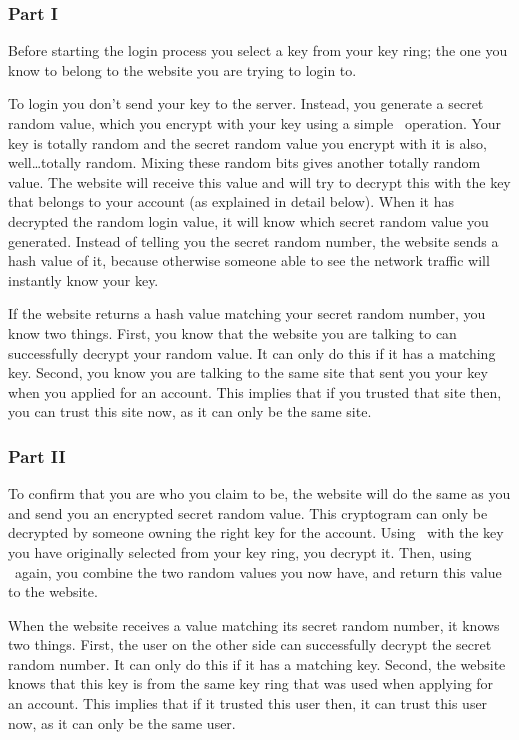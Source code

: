 

\subsubsection{Part I}
Before starting the login process you select a key from your key ring;
the one you know to belong to the website you are trying to login to.
\par
To login you don't send your key to the server.
Instead, you generate a secret random value,
which you encrypt with your key using a simple \XOR\ operation.
Your key is totally random and the secret random value you encrypt with it is also, well\ldots totally random.
Mixing these random bits gives another totally random value.
The website will receive this value and will try to decrypt this with the key that belongs to your account
(as explained in detail below).
When it has decrypted the random login value,
it will know which secret random value you generated.
Instead of telling you the secret random number,
the website sends a hash value of it,
because otherwise someone able to see the network traffic will instantly know your key.
\par
If the website returns a hash value matching your secret random number, you know two things.
First, you know that the website you are talking to can successfully decrypt your random value.
It can only do this if it has a matching key.
Second, you know you are talking to the same site that sent you your key when you applied for an account.
This implies that if you trusted that site then, you can trust this site now, as it can only be the same site.

\subsubsection{Part II}
To confirm that you are who you claim to be,
the website will do the same as you and send you an encrypted secret random value.
This cryptogram can only be decrypted by someone owning the right key for the account.
Using \XOR\ with the key you have originally selected from your key ring,
you decrypt it.
Then,
using \XOR\ again,
you combine the two random values you now have,
and return this value to the website.
\par
When the website receives a value matching its secret random number, it knows two things.
First, the user on the other side can successfully decrypt the secret random number.
It can only do this if it has a matching key.
Second, the website knows that this key is from the same key ring that was used when applying for an account.
This implies that if it trusted this user then, it can trust this user now, as it can only be the same user.

